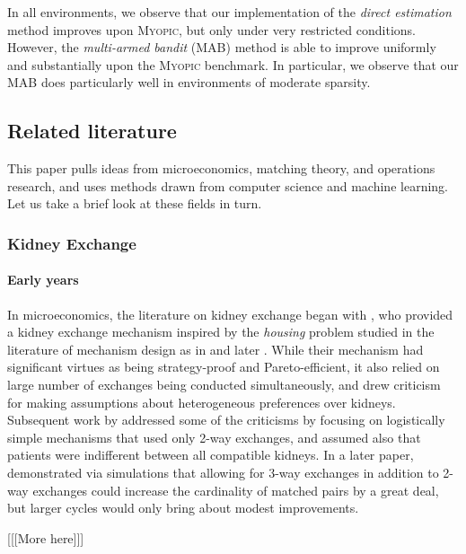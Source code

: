 In all environments, we observe that our implementation of the \emph{direct estimation} method improves upon \textsc{Myopic}, but only under very restricted conditions. However, the \emph{multi-armed bandit} (MAB) method is able to improve uniformly and substantially upon the \textsc{Myopic} benchmark. In particular, we observe that our MAB does particularly well in environments of moderate sparsity.

\subsection{Related literature} This paper pulls ideas from microeconomics, matching theory, and operations research, and uses methods drawn from computer science and machine learning. Let us take a brief look at these fields in turn. 


\subsubsection{Kidney Exchange}

\paragraph{Early years} In microeconomics, the literature on kidney exchange began with \cite{roth2004kidney}, who provided a kidney exchange mechanism inspired by the \emph{housing} problem studied in the literature of mechanism design as in \cite{shapley1974cores} and later \cite{abdulkadirouglu1999house}. While their mechanism had significant virtues as being strategy-proof and Pareto-efficient, it also relied on large number of exchanges being conducted simultaneously, and drew criticism for making assumptions about heterogeneous preferences over kidneys. Subsequent work by \cite{roth2005pairwise} addressed some of the criticisms by focusing on logistically simple mechanisms that used only 2-way exchanges, and assumed also that patients were indifferent between all compatible kidneys. In a later paper, \cite{roth2007efficient} demonstrated via simulations that allowing for 3-way exchanges in addition to 2-way exchanges could increase the cardinality of matched pairs by a great deal, but larger cycles would only bring about modest improvements.

[[[More here]]]


